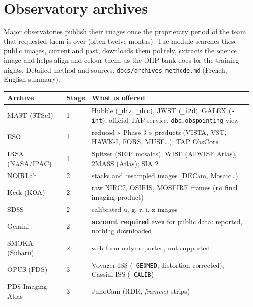 \section{Observatory archives}\label{sec:archives}
Major observatories publish their images once the proprietary period of the team that requested them is over
(often twelve months). The module searches these public images, current and past, downloads them politely, extracts
the science image and helps align and colour them, as the OHP bank does for the training nights. Detailed method and
sources: \texttt{docs/archives\_methode.md} (French, English summary).

\begin{center}\small
\begin{tabularx}{\linewidth}{@{}llX@{}}
\toprule
\textbf{Archive} & \textbf{Stage} & \textbf{What is offered}\\
\midrule
MAST (STScI) & 1 & Hubble (\texttt{\_drz}, \texttt{\_drc}), JWST (\texttt{\_i2d}), GALEX (\texttt{-int}); official TAP service, \texttt{dbo.obspointing} view\\
ESO & 1 & reduced « Phase 3 » products (VISTA, VST, HAWK-I, FORS, MUSE…); TAP ObsCore\\
IRSA (NASA/IPAC) & 1 & Spitzer (SEIP mosaics), WISE (AllWISE Atlas), 2MASS (Atlas); SIA 2\\
NOIRLab & 2 & stacks and resampled images (DECam, Mosaic…)\\
Keck (KOA) & 2 & raw NIRC2, OSIRIS, MOSFIRE frames (no final imaging product)\\
SDSS & 2 & calibrated u, g, r, i, z images\\
Gemini & 2 & \textbf{account required} even for public data: reported, nothing downloaded\\
SMOKA (Subaru) & 2 & web form only: reported, not supported\\
OPUS (PDS) & 3 & Voyager ISS (\texttt{\_GEOMED}, distortion corrected), Cassini ISS (\texttt{\_CALIB})\\
PDS Imaging Atlas & 3 & JunoCam (RDR, \emph{framelet} strips)\\
\bottomrule
\end{tabularx}
\end{center}

